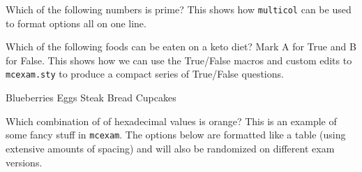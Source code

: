 \documentclass{article}
\begin{document}
\begin{mcquestions}

\question Which of the following numbers is prime? This shows how \texttt{multicol} can be used to format options all on one line.

\begin{multicols}{4}
\begin{mcanswerslist}[ordinal]
\end{mcanswerslist}
\end{multicols}

\begin{mcquestioninstruction}
\numq[5] Which of the following foods can be eaten on a keto diet? Mark A for True and B for False. This shows how we can use the True/False macros and custom edits to \texttt{mcexam.sty} to produce a compact series of True/False questions.
\end{mcquestioninstruction}

\question         Blueberries \qtrue
\question[follow] Eggs        \qtrue
\question[follow] Steak       \qtrue
\question[follow] Bread       \qfalse
\question[follow] Cupcakes    \qfalse


\question Which combination of of hexadecimal values is orange? This is an example of some fancy stuff in \texttt{mcexam}. The options below are formatted like a table (using extensive amounts of spacing) and will also be randomized on different exam versions.

\begin{mcanswers}

\bigskip
\begin{minipage}{0.5\textwidth}
\hspace{2.2em}\hfill{}\hfill{}\par

\quad{}\par

\quad{}\par

\quad{}\par

\quad{}\par

\quad{}
\end{minipage}

\end{mcanswers}




\end{mcquestions}
\end{document}
